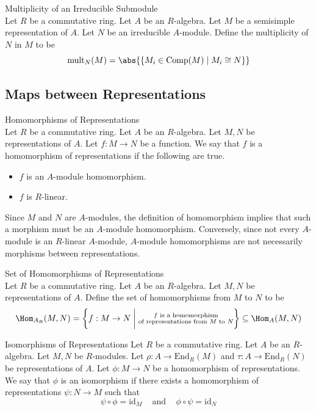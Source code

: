 \documentclass[a4paper]{article}
\begin{document}
\begin{defn}{Multiplicity of an Irreducible Submodule}{}\\
Let $R$ be a commutative ring. Let $A$ be an $R$-algebra. Let $M$ be a semisimple representation of $A$. Let $N$ be an irreducible $A$-module. Define the multiplicity of $N$ in $M$ to be $$\text{mult}_N(M)=\abs{\{M_i\in\text{Comp}(M)\;|\;M_i\cong N\}}$$
\end{defn}

\subsection{Maps between Representations}
\begin{defn}{Homomorphisms of Representations}{}\\
Let $R$ be a commutative ring. Let $A$ be an $R$-algebra. Let $M,N$ be representations of $A$. Let $f:M\to N$ be a function. We say that $f$ is a homomorphism of representations if the following are true. 
\begin{itemize}
\item $f$ is an $A$-module homomorphism. 
\item $f$ is $R$-linear. 
\end{itemize}
\end{defn}

Since $M$ and $N$ are $A$-modules, the definition of homomorphism implies that such a morphism must be an $A$-module homomorphism. Conversely, since not every $A$-module is an $R$-linear $A$-module, $A$-module homomorphisms are not necessarily morphisms between representations. 

\begin{defn}{Set of Homomorphisms of Representations}{}\\
Let $R$ be a commutative ring. Let $A$ be an $R$-algebra. Let $M,N$ be representations of $A$. Define the set of homomorphisms from $M$ to $N$ to be $$\Hom_{A_R}(M,N)=\left\{f:M\to N\;\bigg{|}\;\substack{f\text{ is a homomorphism}\\\text{of representations from }M\text{ to }N}\right\}\subseteq\Hom_A(M,N)$$
\end{defn}

\begin{defn}{Isomorphisms of Representations}{}
Let $R$ be a commutative ring. Let $A$ be an $R$-algebra. Let $M,N$ be $R$-modules. Let $\rho:A\to\text{End}_R(M)$ and $\tau:A\to\text{End}_R(N)$ be representations of $A$. Let $\phi:M\to N$ be a homomorphism of representations. We say that $\phi$ is an isomorphism if there exists a homomorphism of representations $\psi:N\to M$ such that $$\psi\circ\phi=\text{id}_M\;\;\;\text{ and }\;\;\;\phi\circ\psi=\text{id}_N$$
\end{defn}
\end{document}
